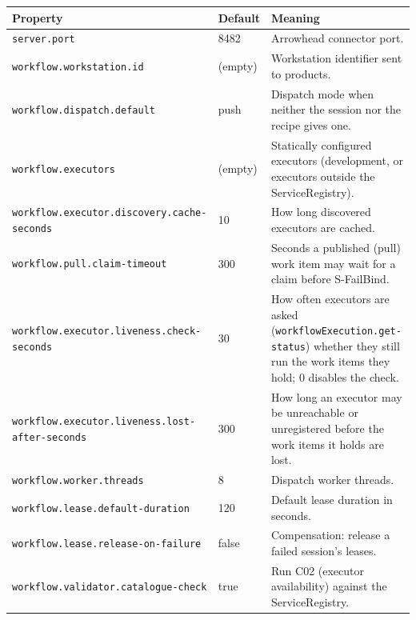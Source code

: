 \documentclass[a4paper]{arrowhead}
\begin{document}
{\small
\begin{longtable}{|p{5.6cm}|p{3.4cm}|p{6.8cm}|}

\hline
\rowcolor{gray!33} Property & Default & Meaning \\ \hline
\endhead
\texttt{server.\allowbreak{}port} & 8482 & Arrowhead connector port. \\ \hline
\texttt{workflow.\allowbreak{}workstation.\allowbreak{}id} & (empty) & Workstation identifier sent to products. \\ \hline
\texttt{workflow.\allowbreak{}dispatch.\allowbreak{}default} & push & Dispatch mode when neither the session nor the recipe gives one. \\ \hline
\texttt{workflow.\allowbreak{}executors} & (empty) & Statically configured executors (development, or executors outside the ServiceRegistry). \\ \hline
\texttt{workflow.\allowbreak{}executor.\allowbreak{}discovery.\allowbreak{}cache-\allowbreak{}seconds} & 10 & How long discovered executors are cached. \\ \hline
\texttt{workflow.\allowbreak{}pull.\allowbreak{}claim-\allowbreak{}timeout} & 300 & Seconds a published (pull) work item may wait for a claim before S-FailBind. \\ \hline
\texttt{workflow.\allowbreak{}executor.\allowbreak{}liveness.\allowbreak{}check-\allowbreak{}seconds} & 30 & How often executors are asked (\texttt{workflow\allowbreak{}Execution.\allowbreak{}get-\allowbreak{}status}) whether they still run the work items they hold; 0 disables the check. \\ \hline
\texttt{workflow.\allowbreak{}executor.\allowbreak{}liveness.\allowbreak{}lost-\allowbreak{}after-\allowbreak{}seconds} & 300 & How long an executor may be unreachable or unregistered before the work items it holds are lost. \\ \hline
\texttt{workflow.\allowbreak{}worker.\allowbreak{}threads} & 8 & Dispatch worker threads. \\ \hline
\texttt{workflow.\allowbreak{}lease.\allowbreak{}default-\allowbreak{}duration} & 120 & Default lease duration in seconds. \\ \hline
\texttt{workflow.\allowbreak{}lease.\allowbreak{}release-\allowbreak{}on-\allowbreak{}failure} & false & Compensation: release a failed session's leases. \\ \hline
\texttt{workflow.\allowbreak{}validator.\allowbreak{}catalogue-\allowbreak{}check} & true & Run C02 (executor availability) against the ServiceRegistry. \\ \hline

\end{longtable}}
\end{document}
